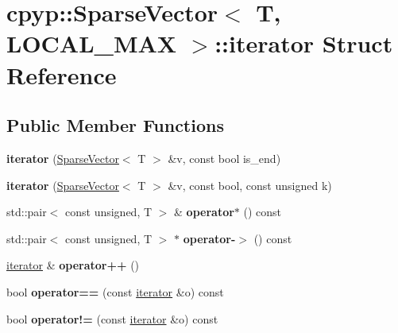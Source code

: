 \hypertarget{structcpyp_1_1_sparse_vector_1_1iterator}{}\section{cpyp\+:\+:Sparse\+Vector$<$ T, L\+O\+C\+A\+L\+\_\+\+M\+AX $>$\+:\+:iterator Struct Reference}
\label{structcpyp_1_1_sparse_vector_1_1iterator}
\subsection*{Public Member Functions}
\begin{DoxyCompactItemize}
\item 
\mbox{\label{structcpyp_1_1_sparse_vector_1_1iterator_a0bfad9c3327771edd10704bf156af436}} 
{\bfseries iterator} (\mbox{\hyperlink{classcpyp_1_1_sparse_vector}{Sparse\+Vector}}$<$ T $>$ \&v, const bool is\+\_\+end)
\item 
\mbox{\label{structcpyp_1_1_sparse_vector_1_1iterator_a7056a1c88f714955580b3af757ddc203}} 
{\bfseries iterator} (\mbox{\hyperlink{classcpyp_1_1_sparse_vector}{Sparse\+Vector}}$<$ T $>$ \&v, const bool, const unsigned k)
\item 
\mbox{\label{structcpyp_1_1_sparse_vector_1_1iterator_aab01aa2614b68697eeddf81b2701fa3c}} 
std\+::pair$<$ const unsigned, T $>$ \& {\bfseries operator$\ast$} () const
\item 
\mbox{\label{structcpyp_1_1_sparse_vector_1_1iterator_a0aa6ea766bab6f65e0bcd17e89a5c557}} 
std\+::pair$<$ const unsigned, T $>$ $\ast$ {\bfseries operator-\/$>$} () const
\item 
\mbox{\label{structcpyp_1_1_sparse_vector_1_1iterator_ab24ea31c3d70e00974fb58655de92169}} 
\mbox{\hyperlink{structcpyp_1_1_sparse_vector_1_1iterator}{iterator}} \& {\bfseries operator++} ()
\item 
\mbox{\label{structcpyp_1_1_sparse_vector_1_1iterator_a67cd7f50bf98ba367346ebd9fe95eaaa}} 
bool {\bfseries operator==} (const \mbox{\hyperlink{structcpyp_1_1_sparse_vector_1_1iterator}{iterator}} \&o) const
\item 
\mbox{\label{structcpyp_1_1_sparse_vector_1_1iterator_adb3e7ec44549e9e344eb15df47940e7f}} 
bool {\bfseries operator!=} (const \mbox{\hyperlink{structcpyp_1_1_sparse_vector_1_1iterator}{iterator}} \&o) const
\end{DoxyCompactItemize}

